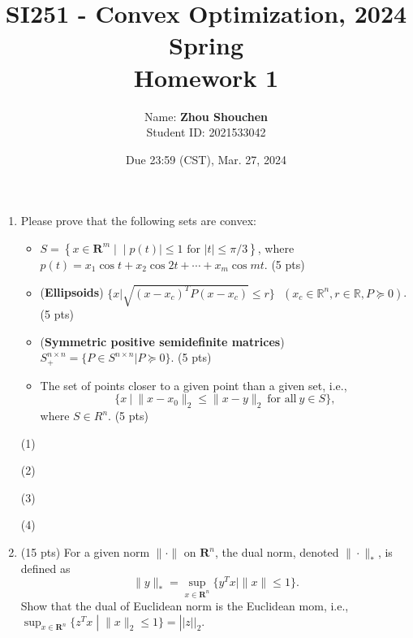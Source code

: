 \documentclass[10pt]{article}
\renewcommand{\mathbf}{\boldsymbol}
\begin{document}
\title{	SI251 - Convex Optimization, 2024 Spring\\Homework 1}
\date{Due 23:59 (CST), Mar. 27, 2024 }

\author{
    Name: \textbf{Zhou Shouchen} \\
	Student ID: 2021533042
}

\maketitle

\newpage


\begin{enumerate}

\section{Convex sets}
\item  Please prove that the following sets are convex: 
\begin{itemize}
    \item[1)] $S=\left\{x \in \mathbf{R}^m \;|\;\mid p(t) \mid \leq 1 \text { for }|t| \leq \pi / 3\right\}$, where $p(t)=x_1 \cos t+x_2 \cos 2 t+\cdots+x_m \cos m t$. {\color{red} (5 pts)}
    \item[2)] (\textbf{Ellipsoids}) $\Big\{x|\sqrt{(x-x_c)^TP(x-x_c)}\leq r\Big\}~~~(x_c\in \mathbb{R}^n, r\in \mathbb{R}, P\succeq 0)$. {\color{red} (5 pts)}
    \item[3)] (\textbf{Symmetric positive semidefinite matrices}) $S_{+}^{n\times n}=\Big\{ P\in S^{n\times n}|P\succeq 0\Big\}$. {\color{red} (5 pts)}
    \item[4)] The set of points closer to a given point than a given set, i.e.,
    \begin{equation*}
        \Big\{x~\vert~\|x-x_0\|_2\leq\|x-y\|_2~\text{for all}~y\in S\Big\},
    \end{equation*}
    where $S\in R^n$. {\color{red} (5 pts)}
\end{itemize}

(1)




(2)



(3)



(4)





\newpage

\item {\color{red} (15 pts)} For a given norm $\|\cdot\|$ on $\mathbf{R}^n$, the dual norm, denoted $\|\cdot\|_*$, is defined as
$$
\|y\|_*=\sup_{x\in\mathbf{R}^n} \{y^T x\mid\|x\|\leq1\}.
$$ 
Show that the dual of Euclidean norm is the Euclidean mom, i.e., $\sup_{x \in \mathbf{R}^n}\{z^{T}x \;| \;\|x\|_2\leq1\}=||z||_{2}.$\\








\end{enumerate}
\end{document}
